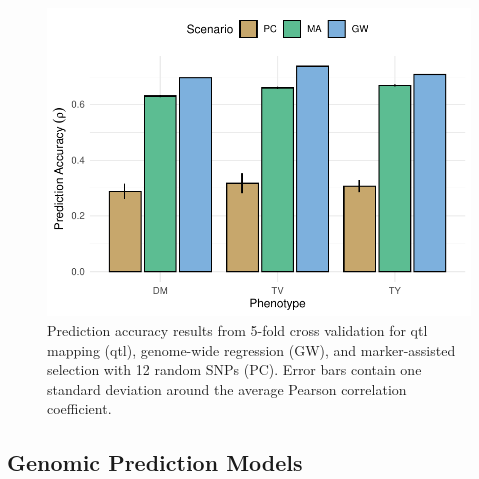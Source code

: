\begin{figure}

{\centering \includegraphics{figs_04/fig-pa-1.pdf}

}

\caption{\label{fig-pa}Prediction accuracy results from 5-fold cross
validation for qtl mapping (qtl), genome-wide regression (GW), and
marker-assisted selection with 12 random SNPs (PC). Error bars contain
one standard deviation around the average Pearson correlation
coefficient.}

\end{figure}

\hypertarget{genomic-prediction-models-1}{%
\subsection{Genomic Prediction
Models}\label{genomic-prediction-models-1}}

